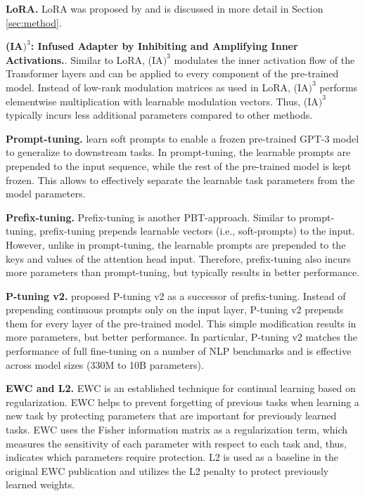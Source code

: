 \textbf{LoRA.} LoRA was proposed by \citep{Hu:21} and is discussed in more detail in Section \ref{sec:method}.

\textbf{(IA$\text{)}^3$: Infused Adapter by Inhibiting and Amplifying Inner Activations.}. Similar to LoRA, (IA$\text{)}^3$ \citep{Liu:22} modulates the inner activation flow of the Transformer layers and can be applied to every component of the pre-trained model. Instead of low-rank modulation matrices as used in LoRA, (IA$\text{)}^3$ performs elementwise multiplication with learnable modulation vectors. Thus, (IA$\text{)}^3$ typically incurs less additional parameters compared to other methods. 

\textbf{Prompt-tuning.} \citet{Lester:21} learn soft prompts to enable a frozen pre-trained GPT-3 \citep{Brown:20} model to generalize to downstream tasks.
In prompt-tuning, the learnable prompts are prepended to the input sequence, while the rest of the pre-trained model is kept frozen. This allows to effectively separate the learnable task parameters from the model parameters. 

\textbf{Prefix-tuning.} Prefix-tuning \citep{Xiang:21} is another PBT-approach. Similar to prompt-tuning, prefix-tuning prepends learnable vectors (i.e., soft-prompts) to the input. However, unlike in prompt-tuning, the learnable prompts are prepended to the keys and values of the attention head input. Therefore, prefix-tuning also incurs more parameters than prompt-tuning, but typically results in better performance. 

\textbf{P-tuning v2.} \citet{Liu:21a} proposed P-tuning v2 as a successor of prefix-tuning. Instead of prepending continuous prompts only on the input layer, P-tuning v2 prepends them for every layer of the pre-trained model. This simple modification results in more parameters, but better performance. In particular, P-tuning v2 matches the performance of full fine-tuning on a number of NLP benchmarks and is effective across model sizes (330M to 10B parameters). 



\textbf{EWC and L2.} EWC \citep{Kirkpatrick:17} is an established technique for continual learning based on regularization. EWC helps to prevent forgetting of previous tasks when learning a new task by protecting parameters that are important for previously learned tasks. EWC uses the Fisher information matrix as a regularization term, which measures the sensitivity of each parameter with respect to each task and, thus, indicates which parameters require protection. L2 is used as a baseline in the original EWC publication \citep{Kirkpatrick:17} and utilizes the L2 penalty to protect previously learned weights. 

